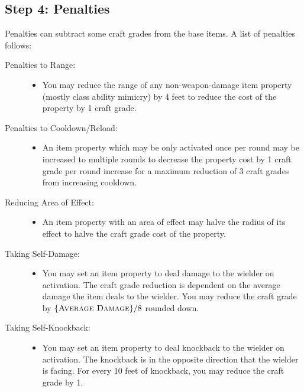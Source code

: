 \subsection{Step 4: Penalties}
Penalties can subtract some craft grades from the base items. A list of penalties follows:
\begin{description}
	\item[Penalties to Range:] \hfill
	\begin{itemize}
		\item You may reduce the range of any non-weapon-damage item property (mostly class ability mimicry) by 4 feet to reduce the cost of the property by 1 craft grade.
	\end{itemize}
	\item[Penalties to Cooldown/Reload:] \hfill
	\begin{itemize}
		\item An item property which may be only activated once per round may be increased to multiple rounds to decrease the property cost by 1 craft grade per round increase for a maximum reduction of 3 craft grades from increasing cooldown.
	\end{itemize}
	\item[Reducing Area of Effect:] \hfill
	\begin{itemize}
		\item An item property with an area of effect may halve the radius of its effect to halve the craft grade cost of the property.
	\end{itemize}
	\item[Taking Self-Damage:] \hfill
	\begin{itemize}
		\item You may set an item property to deal damage to the wielder on activation. The craft grade reduction is dependent on the average damage the item deals to the wielder. You may reduce the craft grade by $\{ \textsc{Average Damage} \}/8$ rounded down.
	\end{itemize}
	\item[Taking Self-Knockback:] \hfill
	\begin{itemize}
		\item You may set an item property to deal knockback to the wielder on activation. The knockback is in the opposite direction that the wielder is facing. For every 10 feet of knockback, you may reduce the craft grade by 1.
	\end{itemize}
\end{description}

